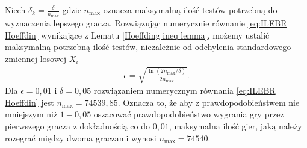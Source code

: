 \documentclass[inzynierska]{pwr_wmat_praca_dyplomowa}
\theoremstyle{plain}
\numberwithin{theorem}{chapter}
\theoremstyle{definition}
\numberwithin{theorem}{chapter}
\newcommand{\nmax}{n_{\text{max}}}
\begin{document}
	Niech $\delta_k = \frac{\delta}{\nmax}$ gdzie $\nmax$ oznacza maksymalną ilość testów potrzebną do wyznaczenia lepszego gracza. Rozwiązując numerycznie równanie \eqref{eq:ILEBR Hoeffdin} wynikające z Lematu \ref{Hoeffding ineq lemma}, możemy ustalić maksymalną potrzebną ilość testów, niezależnie od odchylenia standardowego zmiennej losowej $X_i$
	\begin{gather}
		\label{eq:ILEBR Hoeffdin}
		\epsilon =  \sqrt{\frac{\ln(2\nmax/\delta)}{2\nmax}}.
	\end{gather}
	Dla $\epsilon=0,01$ i $\delta=0,05$ rozwiązaniem numerycznym równania \eqref{eq:ILEBR Hoeffdin} jest $\nmax=74539,85$. Oznacza to, że aby z prawdopodobieństwem nie mniejszym niż $1-0,05$ oszacować prawdopodobieństwo wygrania gry przez pierwszego gracza z dokładnością co do $0,01$, maksymalna ilość gier, jaką należy rozegrać między dwoma graczami wynosi $\nmax  = 74540$.
	   
\end{document}
